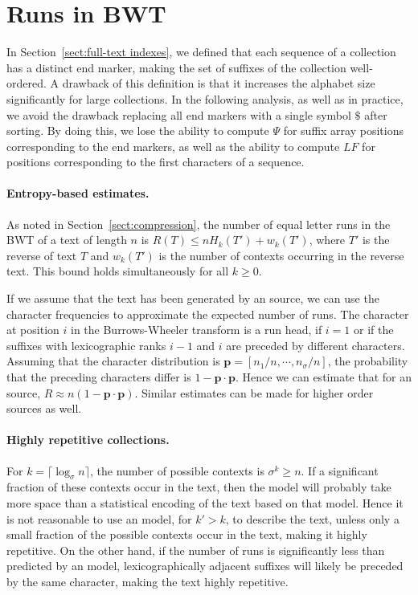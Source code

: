 \section{Runs in BWT}\label{sect:runs}

In Section~\ref{sect:full-text indexes}, we defined that each sequence of a collection has a distinct end marker, making the set of suffixes of the collection well-ordered. A drawback of this definition is that it increases the alphabet size significantly for large collections. In the following analysis, as well as in practice, we avoid the drawback replacing all end markers with a single symbol $\$$ after sorting. By doing this, we lose the ability to compute $\Psi$ for suffix array positions corresponding to the end markers, as well as the ability to compute $LF$ for positions corresponding to the first characters of a sequence.

\paragraph{Entropy-based estimates.}

As noted in Section~\ref{sect:compression}, the number of equal letter runs in the BWT of a text of length $n$ is $R(T) \le nH_{k}(T') + w_{k}(T')$, where $T'$ is the reverse of text $T$ and $w_{k}(T')$ is the number of  contexts occurring in the reverse text. This bound holds simultaneously for all $k \ge 0$.

If we assume that the text has been generated by an  source, we can use the character frequencies to approximate the expected number of runs. The character at position $i$ in the Burrows-Wheeler transform is a run head, if $i = 1$ or if the suffixes with lexicographic ranks $i-1$ and $i$ are preceded by different characters. Assuming that the character distribution is $\mathbf{p} = [n_{1}/n, \cdots, n_{\sigma}/n]$, the probability that the preceding characters differ is $1 - \mathbf{p} \cdot \mathbf{p}$. Hence we can estimate that for an  source, $R \approx n(1 - \mathbf{p} \cdot \mathbf{p})$. Similar estimates can be made for higher order sources as well.

\paragraph{Highly repetitive collections.}

For $k = \lceil \log_{\sigma} n \rceil$, the number of possible  contexts is $\sigma^{k} \ge n$. If a significant fraction of these contexts occur in the text, then the model will probably take more space than a statistical encoding of the text based on that model. Hence it is not reasonable to use an  model, for $k' > k$, to describe the text, unless only a small fraction of the possible contexts occur in the text, making it highly repetitive. On the other hand, if the number of runs is significantly less than predicted by an  model, lexicographically adjacent suffixes will likely be preceded by the same character, making the text highly repetitive.

